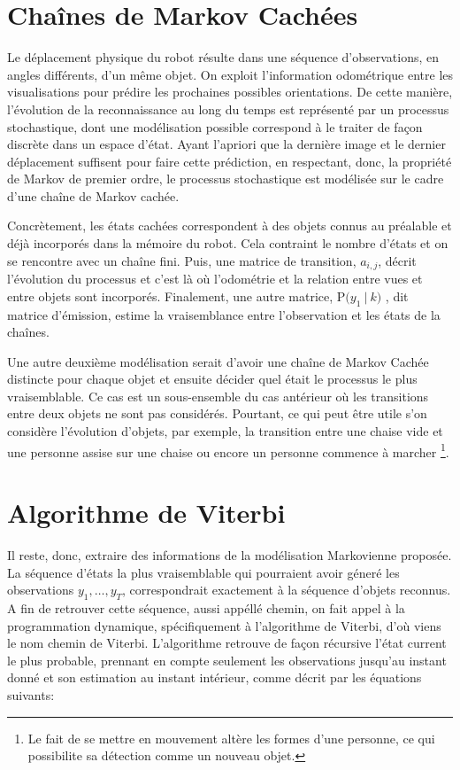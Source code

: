\section {Chaînes de Markov Cachées}

Le déplacement physique du robot résulte dans une séquence
d'observations, en angles différents, d'un même objet. On exploit
l'information odométrique entre les visualisations pour prédire les
prochaines possibles orientations. De cette manière, l'évolution de la
reconnaissance au long du temps est représenté par un processus
stochastique, dont une modélisation possible correspond à le traiter
de façon discrète dans un espace d'état. Ayant l'apriori que la
dernière image et le dernier déplacement suffisent pour faire cette
prédiction, en respectant, donc, la propriété de Markov de premier
ordre, le processus stochastique est modélisée sur le cadre d'une
chaîne de Markov cachée.

Concrètement, les états cachées correspondent à des objets connus au
préalable et déjà incorporés dans la mémoire du robot. Cela contraint le
nombre d'états et on se rencontre avec un chaîne fini. Puis, une
matrice de transition, $a_{i,j}$, décrit l'évolution du processus et c'est là où
l'odométrie et la relation entre vues et entre objets sont
incorporés. Finalement, une autre matrice, $\mathrm{P}\big( y_1 \ | \ k \big)$
, dit matrice d'émission, estime la vraisemblance entre l'observation
et les états de la chaînes.

Une autre deuxième modélisation serait d'avoir une chaîne de Markov
Cachée distincte pour chaque objet et ensuite décider quel était le
processus le plus vraisemblable. Ce cas est un sous-ensemble du cas
antérieur où les transitions entre deux objets ne sont pas
considérés. Pourtant, ce qui peut être utile s'on considère
l'évolution d'objets, par exemple, la transition entre une chaise vide
et une personne assise sur une chaise ou encore un personne
commence à marcher \footnote{Le fait de se mettre en mouvement
  altère les formes d'une personne, ce qui possibilite sa détection
  comme un nouveau objet.}.

\section{Algorithme de Viterbi}

Il reste, donc, extraire des informations de la modélisation Markovienne proposée.
La séquence d'états la plus vraisemblable qui pourraient avoir géneré
les observations  $y_1,\dots, y_T$, correspondrait exactement à la séquence d'objets reconnus.
A fin de retrouver cette séquence, aussi appéllé chemin, on fait 
appel à la programmation dynamique, spécifiquement à l'algorithme de Viterbi, d'où viens le nom chemin de Viterbi.
L'algorithme retrouve de façon récursive l'état current le plus probable, 
prennant en compte seulement les observations jusqu'au instant donné et son
estimation au instant intérieur, comme décrit par les équations suivants:

